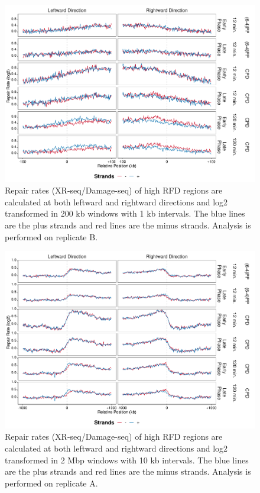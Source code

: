 \begin{figure}[H]
\begin{center}
\includegraphics[width=\textwidth]{Chapters/7_appendix/figures/supfig65}
\caption[Repair rate of high RFDs in 200 kb (replicate B).]{Repair rates (XR-seq/Damage-seq) of high RFD regions are calculated at both leftward and rightward directions and log2 transformed in 200 kb windows with 1 kb intervals. The blue lines are the plus strands and red lines are the minus strands. Analysis is performed on replicate B.}
\label{supfig:rr200rfdB}
\end{center}
\end{figure}

\begin{figure}[H]
\begin{center}
\includegraphics[width=\textwidth]{Chapters/7_appendix/figures/supfig66}
\caption[Repair rate of high RFDs in 2 Mbp (replicate A).]{Repair rates (XR-seq/Damage-seq) of high RFD regions are calculated at both leftward and rightward directions and log2 transformed in 2 Mbp windows with 10 kb intervals. The blue lines are the plus strands and red lines are the minus strands. Analysis is performed on replicate A.}
\label{supfig:rr2000rfdA}
\end{center}
\end{figure}

